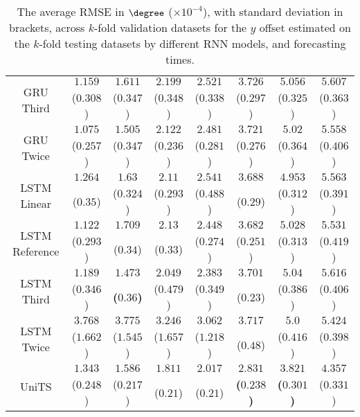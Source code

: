 \begin{table}[!ht]
{\begin{tabular}{|c|c|c|c|c|c|c|c|}
			\multirow{2}{*}{GRU Third} & $1.159$ & $1.611$ & $2.199$ & $2.521$ & $3.726$ & $5.056$ & $5.607$ \\
			 & ($0.308$) & ($0.347$) & ($0.348$) & ($0.338$) & ($0.297$) & ($0.325$) & ($0.363$) \\ \hline
			\multirow{2}{*}{GRU Twice} & $1.075$ & $1.505$ & $2.122$ & $2.481$ & $3.721$ & $5.02$ & $5.558$ \\
			 & ($0.257$) & ($0.347$) & ($0.236$) & ($0.281$) & ($0.276$) & ($0.364$) & ($0.406$) \\ \hline
			\multirow{2}{*}{LSTM Linear} & $1.264$ & $1.63$ & $2.11$ & $2.541$ & $3.688$ & $4.953$ & $5.563$ \\
			 & ($0.35$) & ($0.324$) & ($0.293$) & ($0.488$) & ($0.29$) & ($0.312$) & ($0.391$) \\ \hline
			\multirow{2}{*}{LSTM Reference} & $1.122$ & $1.709$ & $2.13$ & $2.448$ & $3.682$ & $5.028$ & $5.531$ \\
			 & ($0.293$) & ($0.34$) & ($0.33$) & ($0.274$) & ($0.251$) & ($0.313$) & ($0.419$) \\ \hline
			\multirow{2}{*}{LSTM Third} & $1.189$ & $\mathbf{1.473}$ & $2.049$ & $2.383$ & $3.701$ & $5.04$ & $5.616$ \\
			 & ($0.346$) & \textbf{(}$\mathbf{0.36}$\textbf{)} & ($0.479$) & ($0.349$) & ($0.23$) & ($0.386$) & ($0.406$) \\ \hline
			\multirow{2}{*}{LSTM Twice} & $3.768$ & $3.775$ & $3.246$ & $3.062$ & $3.717$ & $5.0$ & $5.424$ \\
			 & ($1.662$) & ($1.545$) & ($1.657$) & ($1.218$) & ($0.48$) & ($0.416$) & ($0.398$) \\ \hline
			\multirow{2}{*}{UniTS} & $1.343$ & $1.586$ & $1.811$ & $2.017$ & $\mathbf{2.831}$ & $\mathbf{3.821}$ & $4.357$ \\
			 & ($0.248$) & ($0.217$) & ($0.21$) & ($0.21$) & \textbf{(}$\mathbf{0.238}$\textbf{)} & \textbf{(}$\mathbf{0.301}$\textbf{)} & ($0.331$) \\ \hline
		\end{tabular}
	}
	\caption{The average RMSE in $\degree$ ($\times 10^{-4}$), with standard deviation in brackets, across $k$-fold validation datasets for the $y$ offset estimated on the $k$-fold testing datasets by different RNN models, and forecasting times.}
	\label{tab:wilcoxon_latitude_no_abs_RMSE}
\end{table}